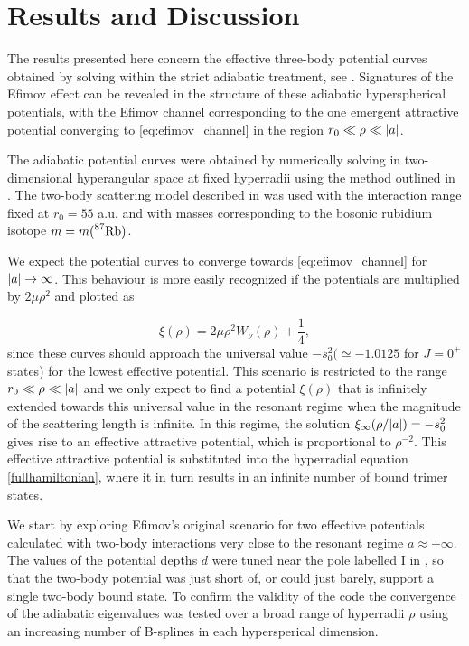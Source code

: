 \chapter{Results and Discussion}
The results presented here concern the effective three-body potential curves obtained by solving  within the strict adiabatic treatment, see . Signatures of the Efimov effect can be revealed in the structure of these adiabatic hyperspherical potentials, with the Efimov channel corresponding to the one emergent attractive potential converging to \eqref{eq:efimov_channel} in the region $r_0 \ll \rho \ll
\lvert a\rvert$.

The adiabatic potential curves were obtained by numerically solving  in  two-dimensional hyperangular space at fixed hyperradii using the method outlined in . The two-body scattering model described in  was used with the interaction range fixed at $r_0=55$ a.u. and with masses corresponding to the bosonic rubidium isotope $m = m( \prescript{87}{}{\mathrm{Rb}})$. 

We expect the potential curves to converge towards \eqref{eq:efimov_channel} for $\lvert a\rvert \rightarrow \infty$. This behaviour is more easily recognized if the potentials are multiplied by $2 \mu \rho^2$ and plotted as 

\begin{equation}\label{eq:lambda}
\xi(\rho) = 2 \mu \rho^2 W_{\nu}(\rho) + \frac{1}{4},
\end{equation}
since these curves should approach the universal value $-s_0^2 (\simeq -1.0125$ for $J=0^+$ states) for the lowest effective potential. This scenario is restricted to the range $r_0 \ll \rho \ll \lvert a\rvert$ and we only expect to find a potential $\xi(\rho)$ that is infinitely extended towards this universal value in the resonant regime when the magnitude of the scattering length is infinite. In this regime, the solution $\xi_{\infty}(\rho/\lvert a\rvert) = -s_0^2$ gives rise to an effective attractive potential, which is proportional to $\rho^{-2}$. This effective attractive potential is substituted into the hyperradial equation \eqref{fullhamiltonian}, where it in turn results in an infinite number of bound trimer states.

We start by exploring Efimov's original scenario for two effective potentials calculated with two-body interactions very close to the resonant regime $a \approx \pm \infty$. The values of the potential depths $d$ were tuned near the pole labelled $\mathrm{I}$ in , so that the two-body potential was just short of, or could just barely, support a single two-body bound state. To confirm the validity of the code the convergence of the adiabatic eigenvalues was tested over a broad range of hyperradii $\rho$ using an increasing number of B-splines in each hypersperical dimension. 

